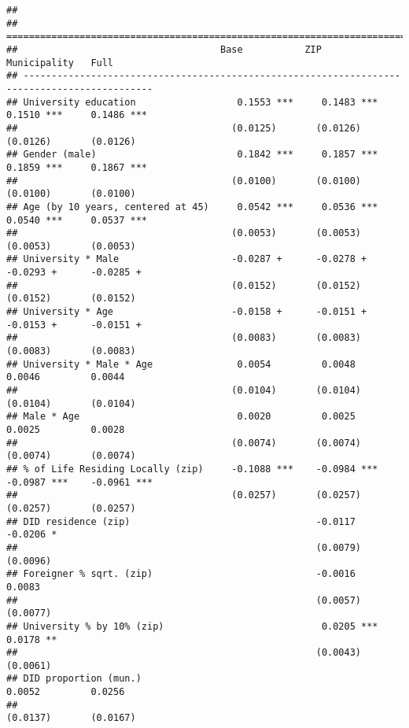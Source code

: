 \documentclass[
]{article}
\begin{document}
\begin{verbatim}
## 
## =============================================================================================
##                                    Base           ZIP            Municipality   Full         
## ---------------------------------------------------------------------------------------------
## University education                  0.1553 ***     0.1483 ***     0.1510 ***     0.1486 ***
##                                      (0.0125)       (0.0126)       (0.0126)       (0.0126)   
## Gender (male)                         0.1842 ***     0.1857 ***     0.1859 ***     0.1867 ***
##                                      (0.0100)       (0.0100)       (0.0100)       (0.0100)   
## Age (by 10 years, centered at 45)     0.0542 ***     0.0536 ***     0.0540 ***     0.0537 ***
##                                      (0.0053)       (0.0053)       (0.0053)       (0.0053)   
## University * Male                    -0.0287 +      -0.0278 +      -0.0293 +      -0.0285 +  
##                                      (0.0152)       (0.0152)       (0.0152)       (0.0152)   
## University * Age                     -0.0158 +      -0.0151 +      -0.0153 +      -0.0151 +  
##                                      (0.0083)       (0.0083)       (0.0083)       (0.0083)   
## University * Male * Age               0.0054         0.0048         0.0046         0.0044    
##                                      (0.0104)       (0.0104)       (0.0104)       (0.0104)   
## Male * Age                            0.0020         0.0025         0.0025         0.0028    
##                                      (0.0074)       (0.0074)       (0.0074)       (0.0074)   
## % of Life Residing Locally (zip)     -0.1088 ***    -0.0984 ***    -0.0987 ***    -0.0961 ***
##                                      (0.0257)       (0.0257)       (0.0257)       (0.0257)   
## DID residence (zip)                                 -0.0117                       -0.0206 *  
##                                                     (0.0079)                      (0.0096)   
## Foreigner % sqrt. (zip)                             -0.0016                        0.0083    
##                                                     (0.0057)                      (0.0077)   
## University % by 10% (zip)                            0.0205 ***                    0.0178 ** 
##                                                     (0.0043)                      (0.0061)   
## DID proportion (mun.)                                               0.0052         0.0256    
##                                                                    (0.0137)       (0.0167)   

\end{verbatim}
\end{document}
